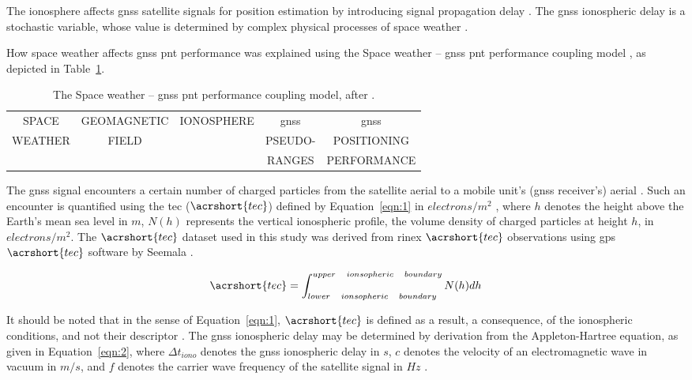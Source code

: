 \documentclass[sn-mathphys-num]{sn-jnl}%
\begin{document}
The ionosphere affects \acrshort{gnss} satellite signals for position estimation by introducing signal propagation delay \cite{spilker1996global, filic2018modelling}. The \acrshort{gnss} ionospheric delay is a stochastic variable, whose value is determined by complex physical processes of space weather \cite{filic2018modelling, filjar2022application}.

How space weather affects \acrshort{gnss} \acrshort{pnt} performance was explained using the Space weather – \acrshort{gnss} \acrshort{pnt} performance coupling model \cite{filic2018modelling}, as depicted in Table~\ref{tab:SpaceWeather}.

\begin{table}[!ht]
    \centering
    \caption{The Space weather – \acrshort{gnss} \acrshort{pnt} performance coupling model, after \cite{filic2018modelling}.}
    \label{tab:SpaceWeather}
    \begin{tabular}{|c|c|c|c|c|}
        \hline
        SPACE & GEOMAGNETIC & IONOSPHERE & \acrshort{gnss} & \acrshort{gnss} \\
        WEATHER & FIELD & & PSEUDO- & POSITIONING \\
         & & & RANGES & PERFORMANCE \\
        \hline
    \end{tabular}
\end{table}

The \acrshort{gnss} signal encounters a certain number of charged particles from the satellite aerial to a mobile unit’s (\acrshort{gnss} receiver’s) aerial \cite{filic2018modelling, filic2018modelling}. Such an encounter is quantified using the \acrlong{tec} ($\acrshort{tec}$) defined by Equation~\ref{eqn:1} in $electrons/m^{2}$  \cite{filic2018modelling, davies1990ionospheric}, where $h$ denotes the height above the Earth’s mean sea level in $m$, $N(h)$ represents the vertical ionospheric profile, the volume density of charged particles at height $h$, in $electrons/m^{2}$. The $\acrshort{tec}$ dataset used in this study was derived from \acrfull{rinex} $\acrshort{tec}$ observations using \acrfull{gps} $\acrshort{tec}$ software by Seemala \cite{SEEMALA202363}.

\begin{equation}
	\acrshort{tec} = \int_{lower \quad ionsopheric \quad boundary}^{upper \quad ionsopheric \quad boundary}N(h)dh
	\label{eqn:1}
\end{equation}

It should be noted that in the sense of Equation~\ref{eqn:1}, $\acrshort{tec}$ is defined as a result, a consequence, of the ionospheric conditions, and not their descriptor \cite{filjar2022application}. The \acrshort{gnss} ionospheric delay may be determined by derivation from the Appleton-Hartree equation, as given in Equation~\ref{eqn:2}, where $\Delta t_{iono}$ denotes the \acrshort{gnss} ionospheric delay in $s$, $c$ denotes the velocity of an electromagnetic wave in vacuum in $m/s$, and $f$ denotes the carrier wave frequency of the satellite signal in $Hz$ \cite{spilker1996global, filic2018modelling}.
\end{document}
